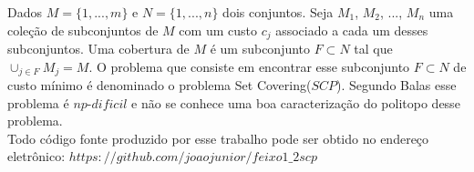 \documentclass{proc}
\begin{document}
Dados $M=\{1,...,m\}$ e $N=\{1,...,n\}$ dois conjuntos. Seja $M_1$, $M_2$, ..., $M_n$ uma coleção de subconjuntos 
de $M$ com um custo $c_j$ associado a cada um desses subconjuntos. Uma cobertura de $M$ é um subconjunto 
$F \subset N$ tal que $\cup_{j \in F} M_j = M$. O problema que consiste em encontrar esse subconjunto $F \subset N$ de custo mínimo
é denominado o problema Set Covering($SCP$). Segundo Balas\cite{balas89} esse problema é $np$-$dificil$ e não se conhece uma boa caracterização do politopo desse
problema. \\

Todo código fonte produzido por esse trabalho pode ser obtido no endereço eletrônico: $https://github.com/joaojunior/feixo1\_2scp$






\end{document}
